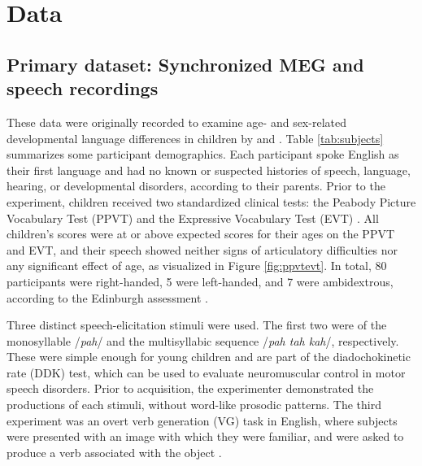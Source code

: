 \documentclass[utf8]{frontiersSCNS} %
\begin{document}
\section{Data}

\subsection{Primary dataset: Synchronized MEG and speech recordings}

These data were originally recorded to examine age- and sex-related developmental language differences in children by \cite{Doesburg2016} and \cite{Yu2014}. Table \ref{tab:subjects} summarizes some participant demographics. Each participant spoke English as their first language and had no known or suspected histories of speech, language, hearing, or developmental disorders, according to their parents. Prior to the experiment, children received two standardized clinical tests: the Peabody Picture Vocabulary Test (PPVT) \cite{Dunn97} and the Expressive Vocabulary Test (EVT) \cite{EVT}. All children's scores were at or above expected scores for their ages on the PPVT and EVT, and their speech showed neither signs of articulatory difficulties nor any significant effect of age, as visualized in Figure \ref{fig:ppvtevt}. In total, 80 participants were right-handed, 5 were left-handed, and 7 were ambidextrous, according to the Edinburgh assessment \cite{Oldfield}. %


Three distinct speech-elicitation stimuli were used. The first two were of the monosyllable /{\em pah}/ and the multisyllabic sequence /{\em pah tah kah}/, respectively. These were simple enough for young children and are part of the diadochokinetic rate (DDK) test, which can be used to evaluate neuromuscular control in motor speech disorders. Prior to acquisition, the experimenter demonstrated the productions of each stimuli, without word-like prosodic patterns. The third experiment was an overt verb generation (VG) task in English, where subjects were presented with an image with which they were familiar, and were asked to produce a verb associated with the object \cite{Doesburg2016}.
\end{document}
